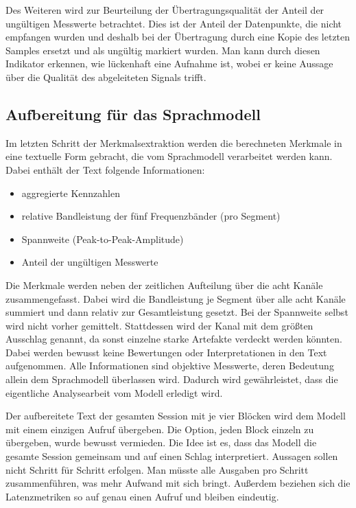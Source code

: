 \noindent Des Weiteren wird zur Beurteilung der Übertragungsqualität der Anteil der ungültigen Messwerte betrachtet. Dies ist der Anteil der Datenpunkte, die nicht empfangen wurden und deshalb bei der Übertragung durch eine Kopie des letzten Samples ersetzt und als ungültig markiert wurden. Man kann durch diesen Indikator erkennen, wie lückenhaft eine Aufnahme ist, wobei er keine Aussage über die Qualität des abgeleiteten Signals trifft.
\vspace{\baselineskip}

\subsection{Aufbereitung für das Sprachmodell}
\label{subsec:aufbereitung}
Im letzten Schritt der Merkmalsextraktion werden die berechneten Merkmale in eine textuelle Form gebracht, die vom Sprachmodell verarbeitet werden kann.
Dabei enthält der Text folgende Informationen:
\begin{itemize}
\item aggregierte Kennzahlen
\item relative Bandleistung der fünf Frequenzbänder (pro Segment)
\item Spannweite (Peak-to-Peak-Amplitude)
\item Anteil der ungültigen Messwerte
\end{itemize}

\noindent Die Merkmale werden neben der zeitlichen Aufteilung über die acht Kanäle zusammengefasst. Dabei wird die Bandleistung je Segment über alle acht Kanäle summiert und dann relativ zur Gesamtleistung gesetzt. Bei der Spannweite selbst wird nicht vorher gemittelt. Stattdessen wird der Kanal mit dem größten Ausschlag genannt, da sonst einzelne starke Artefakte verdeckt werden könnten.
Dabei werden bewusst keine Bewertungen oder Interpretationen in den Text aufgenommen.
Alle Informationen sind objektive Messwerte, deren Bedeutung allein dem Sprachmodell überlassen wird.
Dadurch wird gewährleistet, dass die eigentliche Analysearbeit vom Modell erledigt wird.
\vspace{\baselineskip}

\noindent Der aufbereitete Text der gesamten Session mit je vier Blöcken wird dem Modell mit einem einzigen Aufruf übergeben. Die Option, jeden Block einzeln zu übergeben, wurde bewusst vermieden. Die Idee ist es, dass das Modell die gesamte Session gemeinsam und auf einen Schlag interpretiert. Aussagen sollen nicht Schritt für Schritt erfolgen. Man müsste alle Ausgaben pro Schritt zusammenführen, was mehr Aufwand mit sich bringt. Außerdem beziehen sich die Latenzmetriken so auf genau einen Aufruf und bleiben eindeutig.
\vspace{\baselineskip}


